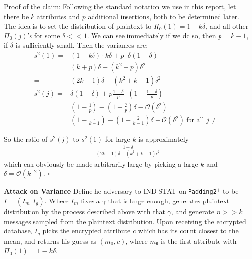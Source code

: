 Proof of the claim: Following the standard notation we use in this report, let there be $k$ attributes and $p$ additional insertions, both to be determined later. The idea is to set the distribution of plaintext to $\Pi_0(1) = 1 - k\delta$, and all other $\Pi_0(j)$'s for some $\delta << 1$. We can see immediately if we do so, then $p = k - 1$, if $\delta$ is sufficiently small. Then the variances are:
\begin{align*}
	s^2(1) = & (1 - k\delta) \cdot k \delta + p \cdot \delta (1 - \delta) \\
		   = & (k+p) \delta - (k^2 + p) \delta^2 \\
		   = & (2k - 1) \delta - (k^2 + k - 1) \delta^2 \\
    s^2(j) = & \delta (1 - \delta) + p \frac{1 - \delta}{p} \cdot \left( 1 - \frac{1 - \delta}{p} \right) \\
    	   = & \left(1 - \frac{1}{p}\right) - \left( 1 - \frac{2}{p} \right) \delta - \mathcal{O}(\delta^2) \\
    	   = & \left(1 - \frac{1}{k-1}\right) - \left( 1 - \frac{2}{k-1} \right) \delta - \mathcal{O}(\delta^2) \ \text{for all } j \neq 1
\end{align*}

So the ratio of $s^2(j)$ to $s^2(1)$ for large $k$ is approximately
\begin{align*}
	\frac{1 - \delta}{(2k - 1) \delta - (k^2 + k - 1) \delta^2} 
\end{align*}
which can obviously be made arbitrarily large by picking a large $k$ and $\delta = \mathcal{O}(k^{-2})$. $\square$

\textbf{Attack on Variance} Define he adversary to IND-STAT on \texttt{Padding2}$^{+}$ to be $I = (I_m, I_g)$. Where $I_m$ fixes a $\gamma$ that is large enough, generates plaintext distribution by the process described above with that $\gamma$, and generate $n >> k$ messages sampled from the plaintext distribution. Upon receiving the encrypted database, $I_g$ picks the encrypted attribute $c$ which has its count closest to the mean, and returns his guess as $(m_0,c)$, where $m_0$ is the first attribute with $\Pi_0(1) = 1 - k\delta$.

